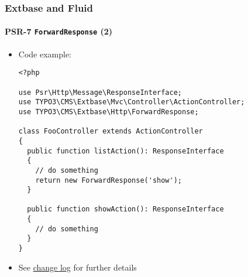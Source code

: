 %

\begin{frame}[fragile]
	\frametitle{Extbase and Fluid}
	\framesubtitle{PSR-7 \texttt{ForwardResponse} (2)}


	\begin{itemize}
		\item Code example:
\begin{lstlisting}
<?php

use Psr\Http\Message\ResponseInterface;
use TYPO3\CMS\Extbase\Mvc\Controller\ActionController;
use TYPO3\CMS\Extbase\Http\ForwardResponse;

class FooController extends ActionController
{
  public function listAction(): ResponseInterface
  {
    // do something
    return new ForwardResponse('show');
  }

  public function showAction(): ResponseInterface
  {
    // do something
  }
}
\end{lstlisting}

		\item See \href{https://docs.typo3.org/c/typo3/cms-core/master/en-us/Changelog/11.0/Deprecation-92784-ExtbaseControllerActionsMustReturnResponseInterface.html}{change log}
			for further details

	\end{itemize}

\end{frame}

